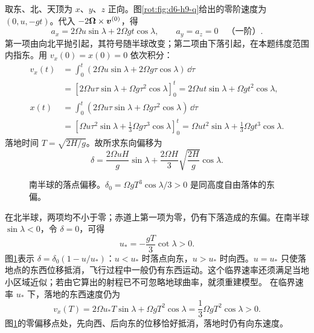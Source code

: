 \begin{solution}
取东、北、天顶为 $x$、$y$、$z$ 正向。图\ref{rot:fig:d6-h9-q}给出的零阶速度为 $(0,u,-gt)$。代入 $-2\bm{\Omega}\times\bm{v}^{(0)}$，得
\[
a_x=2\Omega u\sin\lambda+2\Omega gt\cos\lambda,
\qquad a_y=a_z=0\quad\text{（一阶）}.
\]
第一项由向北平抛引起，其符号随半球改变；第二项由下落引起，在本题纬度范围内指东。用 $v_x(0)=x(0)=0$ 依次积分：
\[
\begin{aligned}
v_x(t)&=\int_0^t(2\Omega u\sin\lambda+2\Omega g\tau\cos\lambda)\,\dd\tau\\
&=\left[2\Omega u\tau\sin\lambda+\Omega g\tau^2\cos\lambda\right]_0^t
=2\Omega ut\sin\lambda+\Omega gt^2\cos\lambda,\\
x(t)&=\int_0^t(2\Omega u\tau\sin\lambda+\Omega g\tau^2\cos\lambda)\,\dd\tau\\
&=\left[\Omega u\tau^2\sin\lambda+\frac13\Omega g\tau^3\cos\lambda\right]_0^t
=\Omega ut^2\sin\lambda+\frac13\Omega gt^3\cos\lambda.
\end{aligned}
\]
落地时间 $T=\sqrt{2H/g}$。故所求东向偏移为
\[
\boxed{\delta=\frac{2\Omega uH}{g}\sin\lambda
+\frac{2\Omega H}{3}\sqrt{\frac{2H}{g}}\cos\lambda.}
\]
\begin{figure}[H]\centering
{}
\caption{南半球的落点偏移。$\delta_0=\Omega gT^3\cos\lambda/3>0$ 是同高度自由落体的东偏。}\label{rot:fig:d6-h9-s}
\end{figure}
在北半球，两项均不小于零；赤道上第一项为零，仍有下落造成的东偏。在南半球 $\sin\lambda<0$，令 $\delta=0$，可得
\[
\boxed{u_*= -\frac{gT}{3}\cot\lambda>0.}
\]
图\ref{rot:fig:d6-h9-s}表示 $\delta=\delta_0(1-u/u_*)$：$u<u_*$ 时落点向东，$u>u_*$ 时向西。$u=u_*$ 只使落地点的东西位移抵消，飞行过程中一般仍有东西运动。这个临界速率还须满足当地小区域近似；若由它算出的射程已不可忽略地球曲率，就须重建模型。
在临界速率 $u_*$ 下，落地的东西速度仍为
\[
v_x(T)=2\Omega u_*T\sin\lambda+\Omega gT^2\cos\lambda
=\frac13\Omega gT^2\cos\lambda>0.
\]
图\ref{rot:fig:d6-h9-s}的零偏移点处，先向西、后向东的位移恰好抵消，落地时仍有向东速度。
\end{solution}



